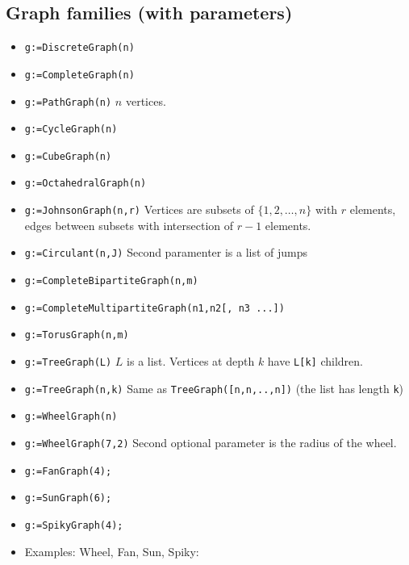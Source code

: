 \documentclass[11pt]{article}
\begin{document}
\begin{multicols}{3}
\section{Graph families (with parameters)}
\label{sec:org5950968}

\begin{itemize}
\item \texttt{g:=DiscreteGraph(n)}
\item \texttt{g:=CompleteGraph(n)}
\item \texttt{g:=PathGraph(n)} \(n\) vertices.
\item \texttt{g:=CycleGraph(n)}
\item \texttt{g:=CubeGraph(n)}
\item \texttt{g:=OctahedralGraph(n)}
\item \texttt{g:=JohnsonGraph(n,r)} Vertices are subsets of \(\{1,2,\ldots,n\}\)
with \(r\) elements, edges between subsets with intersection of
\(r-1\) elements.
\item \texttt{g:=Circulant(n,J)} Second paramenter is a list of jumps
\item \texttt{g:=CompleteBipartiteGraph(n,m)}
\item \texttt{g:=CompleteMultipartiteGraph(n1,n2[, n3 ...])}
\item \texttt{g:=TorusGraph(n,m)}
\item \texttt{g:=TreeGraph(L)} \(L\) is a list. Vertices at depth \(k\) have
\texttt{L[k]} children.
\item \texttt{g:=TreeGraph(n,k)} Same as \texttt{TreeGraph([n,n,..,n])} (the list has
length \texttt{k})
\item \texttt{g:=WheelGraph(n)}
\item \texttt{g:=WheelGraph(7,2)} Second optional parameter is the radius of the
wheel.
\item \texttt{g:=FanGraph(4);}
\item \texttt{g:=SunGraph(6);}
\item \texttt{g:=SpikyGraph(4);}
\item Examples: Wheel, Fan, Sun, Spiky:


\end{itemize}
\end{multicols}
\end{document}

